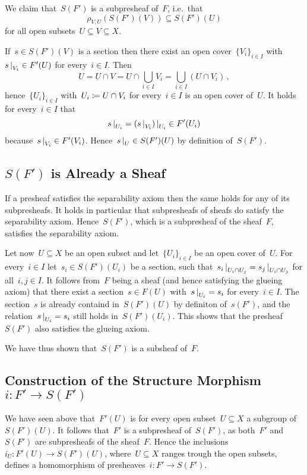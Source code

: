 We claim that~$S(F')$ is a subpresheaf of~$F$, i.e.\ that
\[
            \rho_{V,U}(S(F')(V))
  \subseteq S(F')(U)
\]
for all open subsets~$U \subseteq V \subseteq X$.

If~$s \in S(F')(V)$ is a section then there exist an open cover~$\{ V_i \}_{i \in I}$ with~$\restrict{s}{V_i} \in F'(U)$ for every~$i \in I$.
Then
\[
    U
  = U \cap V
  = U \cap \bigcup_{i \in I} V_i
  = \bigcup_{i \in I} (U \cap V_i) \,,
\]
hence~$\{ U_i \}_{i \in I}$ with~$U_i \coloneqq U \cap V_i$ for every~$i \in I$ is an open cover of~$U$.
It holds for every~$i \in I$ that
\[
      \restrict{s}{U_i}
  =   \restrict{(\restrict{s}{V_i})}{U_i}
  \in F'(U_i)
\]
because~$\restrict{s}{V_i} \in F'(V_i)$.
Hence~$\restrict{s}{U} \in S(F')(U)$ by definition of~$S(F')$.





\subsection*{$S(F')$ is Already a Sheaf}

If a presheaf satisfies the separability axiom then the same holds for any of its subpresheafs.
It holds in particular that subpresheafs of sheafs do satisfy the separability axiom.
Hence~$S(F')$, which is a subpresheaf of the sheaf~$F$, satisfies the separability axiom.

Let now~$U \subseteq X$ be an open subset and let~$\{ U_i \}_{i \in I}$ be an open cover of~$U$.
For every~$i \in I$ let~$s_i \in S(F')(U_i)$ be a section, such that~$\restrict{s_i}{U_i \cap U_j} = \restrict{s_j}{U_i \cap U_j}$ for all~$i, j \in I$.
It follows from~$F$ being a sheaf (and hence satisfying the glueing axiom) that there exist a section~$s \in F(U)$ with~$\restrict{s}{U_i} = s_i$ for every~$i \in I$.
The section~$s$ is already containd in~$S(F')(U)$ by definiton of~$s(F')$, and the relation~$\restrict{s}{U_i} = s_i$ still holds in~$S(F')(U_i)$.
This shows that the presheaf~$S(F')$ also satisfies the glueing axiom.

We have thus shown that~$S(F')$ is a subsheaf of~$F$.





\subsection*{Construction of the Structure Morphism~$i \colon F' \to S(F')$}

We have seen above that~$F'(U)$ is for every open subset~$U \subseteq X$ a subgroup of~$S(F')(U)$.
It follows that~$F'$ is a subpresheaf of~$S(F')$, as both~$F'$ and~$S(F')$ are subpresheafs of the sheaf~$F$.
Hence the inclusions~$i_U \colon F'(U) \to S(F')(U)$, where~$U \subseteq X$ ranges trough the open subsets, defines a homomorphism of presheaves~$i \colon F' \to S(F')$.





